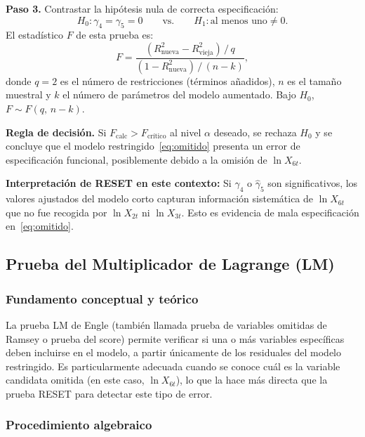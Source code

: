 \documentclass[12pt, letterpaper]{article}
\begin{document}
\textbf{Paso 3.} Contrastar la hipótesis nula de correcta especificación:
\begin{equation}
  H_0: \gamma_4 = \gamma_5 = 0
  \qquad \text{vs.} \qquad
  H_1: \text{al menos uno} \neq 0.
  \label{eq:h0_reset}
\end{equation}
El estadístico $F$ de esta prueba es:
\begin{equation}
  F = \frac{(R_{\text{nueva}}^2 - R_{\text{vieja}}^2)\,/\,q}
           {(1 - R_{\text{nueva}}^2)\,/\,(n - k)},
  \label{eq:F_reset}
\end{equation}
donde $q = 2$ es el número de restricciones (términos añadidos),
$n$ es el tamaño muestral y $k$ el número de parámetros del modelo
aumentado. Bajo $H_0$, $F \sim F(q,\, n-k)$.

\textbf{Regla de decisión.} Si $F_{\text{calc}} > F_{\text{crítico}}$
al nivel $\alpha$ deseado, se rechaza $H_0$ y se concluye que el modelo
restringido~\eqref{eq:omitido} presenta un error de especificación
funcional, posiblemente debido a la omisión de $\ln X_{6t}$.

\begin{clave}
  \textbf{Interpretación de RESET en este contexto:} Si $\hat{\gamma}_4$
  o $\hat{\gamma}_5$ son significativos, los valores ajustados del
  modelo corto capturan información sistemática de $\ln X_{6t}$ que
  no fue recogida por $\ln X_{2t}$ ni $\ln X_{3t}$. Esto es evidencia
  de mala especificación en~\eqref{eq:omitido}.
\end{clave}

\subsection{Prueba del Multiplicador de Lagrange (LM)}

\subsubsection*{Fundamento conceptual y teórico}

La prueba LM de Engle (también llamada prueba de variables omitidas de
Ramsey o prueba del score) permite verificar si una o más variables
específicas deben incluirse en el modelo, a partir únicamente de los
residuales del modelo restringido. Es particularmente adecuada cuando
se conoce cuál es la variable candidata omitida (en este caso,
$\ln X_{6t}$), lo que la hace más directa que la prueba RESET para
detectar este tipo de error.

\subsubsection*{Procedimiento algebraico}
\end{document}
